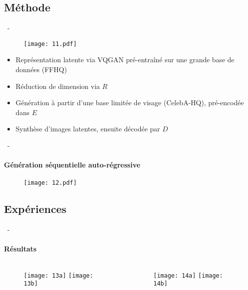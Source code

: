 \documentclass[aspectratio=169, 22pt]{beamer}
\begin{document}
\subsection{Méthode}
\begin{frame}{\secname~- \subsecname}
  \begin{figure}
    \texttt{[image: 11.pdf]}
  \end{figure}
  \begin{itemize}
  \item Représentation latente via VQGAN pré-entraîné sur une grande base de données (FFHQ)
  \item Réduction de dimension via $R$
  \item Génération à partir d'une base limitée de visage (CelebA-HQ), pré-encodée dans $E$
  \item Synthèse d'images latentes, ensuite décodée par $D$
  \end{itemize}
\end{frame}

\begin{frame}{\secname~- \subsecname}
  \framesubtitle{Génération séquentielle auto-régressive}
  \begin{figure}
    \texttt{[image: 12.pdf]}
  \end{figure}
\end{frame}

\subsection{Expériences}
\begin{frame}{\secname~- \subsecname}
  \framesubtitle{Résultats}
  \begin{columns}
    \begin{column}{0.5\linewidth}
      \begin{figure}
        \texttt{[image: 13a]}
        \texttt{[image: 13b]}
      \end{figure}
    \end{column}
    \begin{column}{0.5\linewidth}
      \begin{figure}
        \texttt{[image: 14a]}
        \texttt{[image: 14b]}
      \end{figure}
    \end{column}
  \end{columns}
\end{frame}
\end{document}
